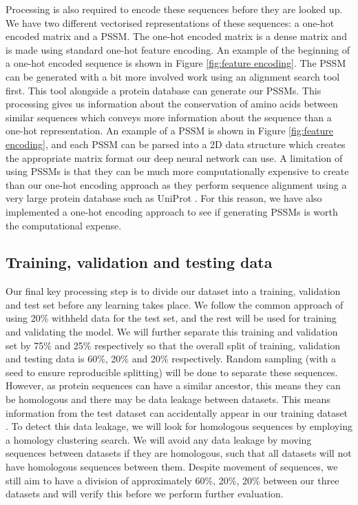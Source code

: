 \documentclass{l4proj}
\begin{document}
Processing is also required to encode these sequences before they are looked up. We have two different vectorised representations of these sequences: a one-hot encoded matrix and a PSSM. The one-hot encoded matrix is a dense matrix and is made using standard one-hot feature encoding. An example of the beginning of a one-hot encoded sequence is shown in Figure \ref{fig:feature encoding}. The PSSM can be generated with a bit more involved work using an alignment search tool first. This tool alongside a protein database can generate our PSSMs. This processing gives us information about the conservation of amino acids between similar sequences which conveys more information about the sequence than a one-hot representation. An example of a PSSM is shown in Figure \ref{fig:feature encoding}, and each PSSM can be parsed into a 2D data structure which creates the appropriate matrix format our deep neural network can use. A limitation of using PSSMs is that they can be much more computationally expensive to create than our one-hot encoding approach as they perform sequence alignment using a very large protein database such as UniProt \citep{uniprot:22}. For this reason, we have also implemented a one-hot encoding approach to see if generating PSSMs is worth the computational expense. 

\subsection{Training, validation and testing data}

Our final key processing step is to divide our dataset into a training, validation and test set before any learning takes place. We follow the common approach of using 20\% withheld data for the test set, and the rest will be used for training and validating the model. We will further separate this training and validation set by 75\% and 25\% respectively so that the overall split of training, validation and testing data is 60\%, 20\% and 20\% respectively. Random sampling (with a seed to ensure reproducible splitting) will be done to separate these sequences. However, as protein sequences can have a similar ancestor, this means they can be homologous and there may be data leakage between datasets. This means information from the test dataset can accidentally appear in our training dataset \citep{Cook:22}. To detect this data leakage, we will look for homologous sequences by employing a homology clustering search. We will avoid any data leakage by moving sequences between datasets if they are homologous, such that all datasets will not have homologous sequences between them. Despite movement of sequences, we still aim to have a division of approximately 60\%, 20\%, 20\% between our three datasets and will verify this before we perform further evaluation. 
\end{document}
